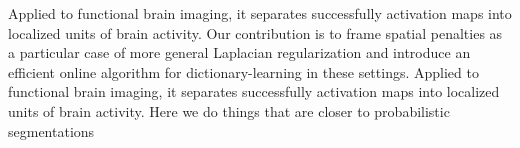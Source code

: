 Applied to
functional brain imaging, it separates successfully activation maps into
localized units of brain activity.
Our contribution is to frame spatial penalties as a particular case of
more general Laplacian regularization and introduce an efficient online
algorithm for dictionary-learning in these settings. Applied to
functional brain imaging, it separates successfully activation maps into
localized units of brain activity.
Here we do things that are closer to probabilistic segmentations



